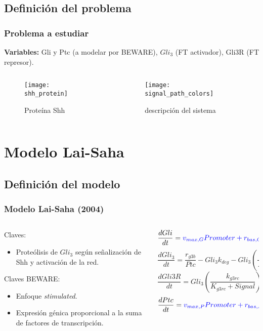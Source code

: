 \documentclass{beamer}
\begin{document}
\subsection{Definición del problema}

\begin{frame}
\frametitle{Problema a estudiar}
\textbf{Variables:} Gli y Ptc (a modelar por BEWARE), $Gli_3$ (FT activador), Gli3R (FT represor).
\begin{columns}
	\begin{column}{0.5\textwidth}
\begin{figure}
\texttt{[image: shh\_protein]}\caption{Proteína Shh}
\end{figure}
\end{column}
\begin{column}{0.5\textwidth}
\begin{figure}
	\texttt{[image: signal\_path\_colors]}\caption{descripción del sistema}
\end{figure}
\end{column}
\end{columns}
\end{frame}

\section{Modelo Lai-Saha}
\subsection{Definición del modelo}
\begin{frame}
  \frametitle{Modelo Lai-Saha (2004)}
\begin{columns}
	\begin{column}{0.5\textwidth}
		Claves:
		\begin{itemize}
			\item Proteólisis de $Gli_3$ según señalización de Shh y activación de la red. 
		\end{itemize}
			Claves \color{blue}BEWARE:
	\begin{itemize}
		\item Enfoque \textit{stimulated}.
		\item Expresión génica proporcional a la suma de factores de transcripción.
	\end{itemize}
	\end{column}
	\begin{column}{0.5\textwidth}
		{\tiny\[ \frac{dGli}{dt} = \color{blue}v_{max,G}Promoter+r_{bas,G}Basal\color{black}-k_{deg}Gli \]}
		{\tiny\[ \frac{dGli_3}{dt} = \frac{r_{g3b}}{Ptc}-Gli_3k_{deg}-Gli_3\left(\frac{k_{g3rc}}{K_{g3rc}+Signal}\right), \]}
		{\tiny\[ \frac{dGli3R}{dt}= Gli_3\left(\frac{k_{g3rc}}{K_{g3rc}+Signal}\right)-k_{deg}Gli3R, \]}
		{\tiny\[ \frac{dPtc}{dt} = \color{blue}v_{max,P}Promoter+r_{bas,P}Basal\color{black}-k_{degp}Ptc.\]}

	\end{column}
\end{columns}
\end{frame}
\end{document}
